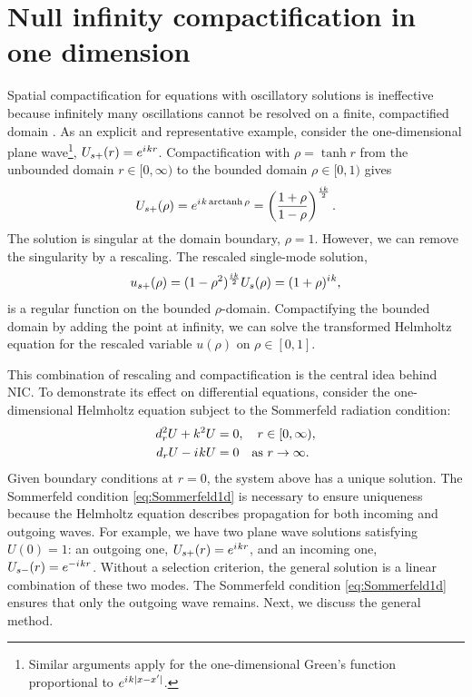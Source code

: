 \documentclass[onefignum,onetabnum]{siamart190516}
\newcommand{\be}{\begin{equation}}
\newcommand{\ee}{\end{equation}}
\newcommand{\iu}{{i\mkern1mu}}
\DeclareMathOperator\arctanh{arctanh}
\begin{document}
\section{Null infinity compactification in one dimension}\label{sec:nic1d}
Spatial compactification for equations with oscillatory solutions is ineffective because infinitely many oscillations cannot be resolved on a finite, compactified domain \cite{GroschOrszag77, shen2014approximations}. As an explicit and representative example, consider the one-dimensional plane wave\footnote{Similar arguments apply for the one-dimensional Green's function proportional to $e^{\iu k |x-x'|}$.}, $U_{s+}(r) = e^{\iu k r}$. Compactification with $\rho=\tanh r$ from the unbounded domain $r\in[0,\infty)$ to the bounded domain $\rho\in[0,1)$ gives
\[ U_{s+}(\rho) =   e^{\iu k \arctanh\rho} = \left(\frac{1+\rho}{1-\rho}\right)^{\frac{\iu k}{2}}.\]
The solution is singular at the domain boundary, $\rho=1$. However, we can remove the singularity by a rescaling. The rescaled single-mode solution,
\be\label{eq:plane_tanh} u_{s+}(\rho) =  (1-\rho^2)^{\frac{\iu k}{2}} U_s(\rho) = (1+\rho)^{\iu k}, \ee
is a regular function on the bounded $\rho$-domain. Compactifying the bounded domain by adding the point at infinity, we can solve the transformed Helmholtz equation for the rescaled variable $u(\rho)$ on $\rho\in[0,1]$. 

This combination of rescaling and compactification is the central idea behind NIC. To demonstrate its effect on differential equations, consider the one-dimensional Helmholtz equation subject to the Sommerfeld radiation condition:
\begin{align}
	\label {eq:Helmholtz1d} d_r^2 U + k^2 U &= 0, \quad r\in[0,\infty),\\
	\label{eq:Sommerfeld1d}d_r U - \iu k U &= 0 \quad \mathrm{as} \ r\to\infty.
\end{align}
Given boundary conditions at $r=0$, the system above has a unique solution. The Sommerfeld condition \eqref{eq:Sommerfeld1d} is necessary to ensure uniqueness because the Helmholtz equation describes propagation for both incoming and outgoing waves. For example, we have two plane wave solutions satisfying $U(0) = 1$: an outgoing one, $U_{s+}(r) = e^{\iu k r}$, and an incoming one, $U_{s-}(r) = e^{-\iu k r}$. Without a selection criterion, the general solution is a linear combination of these two modes. The Sommerfeld condition \eqref{eq:Sommerfeld1d} ensures that only the outgoing wave remains. Next, we discuss the general method. 
\end{document}

